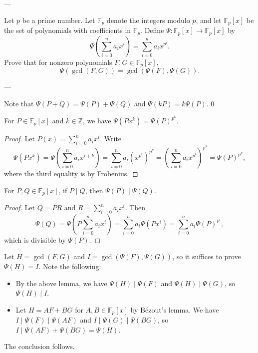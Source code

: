 
---

Let $p$ be a prime number. Let $\mathbb F_p$ denote the integers modulo $p$, and let $\mathbb F_p[x]$ be the set of polynomials with coefficients in $\mathbb F_p$. Define $\Psi:\mathbb F_p[x]\to\mathbb F_p[x]$ by \[\Psi\left(\sum_{i=0}^na_ix^i\right)=\sum_{i=0}^na_ix^{p^i}.\]
Prove that for nonzero polynomials $F,G\in\mathbb F_p[x]$, \[\Psi(\gcd(F,G))=\gcd(\Psi(F),\Psi(G)).\]

---

Note that $\Psi(P+Q)=\Psi(P)+\Psi(Q)$ and $\Psi(kP)=k\Psi(P)$.
\setcounter{boxlemma}0
\begin{boxlemma}
    For $P\in\mathbb F_p[x]$ and $k\in\mathbb Z$, we have $\Psi(Px^k)=\Psi(P)^{p^k}$.
\end{boxlemma}
\begin{proof}
    Let $P(x)=\sum_{i=0}^na_ix^i$. Write \[\Psi(Px^k)=\Psi\left(\sum_{i=0}^na_ix^{i+k}\right)=\sum_{i=0}^na_i\left(x^{p^i}\right)^{p^k}=\left(\sum_{i=0}^na_ix^{p^i}\right)^{p^k}=\Psi(P)^{p^k},\]
    where the third equality is by Frobenius.
\end{proof}
\begin{boxlemma}
    For $P,Q\in\mathbb F_p[x]$, if $P\mid Q$, then $\Psi(P)\mid\Psi(Q)$.
\end{boxlemma}
\begin{proof}
    Let $Q=PR$ and $R=\sum_{i=0}^na_ix^i$. Then \[\Psi(Q)=\Psi\left(P\sum_{i=0}^na_ix^i\right)=\sum_{i=0}^na_i\Psi(Px^i)=\sum_{i=0}^na_i\Psi(P)^{p^i},\]
    which is divisible by $\Psi(P)$.
\end{proof}

Let $H=\gcd(F,G)$ and $I=\gcd(\Psi(F),\Psi(G))$, so it suffices to prove $\Psi(H)=I$. Note the following:
\begin{itemize}
    \item By the above lemma, we have $\Psi(H)\mid\Psi(F)$ and $\Psi(H)\mid\Psi(G)$, so $\Psi(H)\mid I$.
    \item Let $H=AF+BG$ for $A,B\in\mathbb F_p[x]$ by B\'ezout's lemma. We have $I\mid\Psi(F)\mid\Psi(AF)$ and $I\mid\Psi(G)\mid\Psi(BG)$, so $I\mid\Psi(AF)+\Psi(BG)=\Psi(H)$.
\end{itemize}
The conclusion follows.

